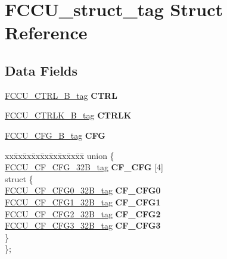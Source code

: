 \hypertarget{structFCCU__struct__tag}{}\section{F\+C\+C\+U\+\_\+struct\+\_\+tag Struct Reference}
\label{structFCCU__struct__tag}
\subsection*{Data Fields}
\begin{DoxyCompactItemize}
\item 
\mbox{\label{structFCCU__struct__tag_a3c6d1a5649e7484df61c81ba682be9c1}} 
\mbox{\hyperlink{unionFCCU__CTRL__32B__tag}{F\+C\+C\+U\+\_\+\+C\+T\+R\+L\+\_\+B\+\_\+tag}} {\bfseries C\+T\+RL}
\item 
\mbox{\label{structFCCU__struct__tag_a0c8863135f5e4a3c5152f749d6bff5bd}} 
\mbox{\hyperlink{unionFCCU__CTRLK__32B__tag}{F\+C\+C\+U\+\_\+\+C\+T\+R\+L\+K\+\_\+B\+\_\+tag}} {\bfseries C\+T\+R\+LK}
\item 
\mbox{\label{structFCCU__struct__tag_ab76a5293657319c3ccbfa710d0ed9829}} 
\mbox{\hyperlink{unionFCCU__CFG__32B__tag}{F\+C\+C\+U\+\_\+\+C\+F\+G\+\_\+B\+\_\+tag}} {\bfseries C\+FG}
\item 
\mbox{\label{structFCCU__struct__tag_a864722bf7be457b9b94d35437d4def32}} 
\begin{tabbing}
xx\=xx\=xx\=xx\=xx\=xx\=xx\=xx\=xx\=\kill
union \{\\
\>\mbox{\hyperlink{unionFCCU__CF__CFG__32B__tag}{FCCU\_CF\_CFG\_32B\_tag}} {\bfseries CF\_CFG} \mbox{[}4\mbox{]}\\
\mbox{\label{unionFCCU__struct__tag_1_1_0D2086_acda38be3ad6a5fd0dce13796142eb2ae}} 
\>struct \{\\
\>\>\mbox{\hyperlink{unionFCCU__CF__CFG0__32B__tag}{FCCU\_CF\_CFG0\_32B\_tag}} {\bfseries CF\_CFG0}\\
\>\>\mbox{\hyperlink{unionFCCU__CF__CFG1__32B__tag}{FCCU\_CF\_CFG1\_32B\_tag}} {\bfseries CF\_CFG1}\\
\>\>\mbox{\hyperlink{unionFCCU__CF__CFG2__32B__tag}{FCCU\_CF\_CFG2\_32B\_tag}} {\bfseries CF\_CFG2}\\
\>\>\mbox{\hyperlink{unionFCCU__CF__CFG3__32B__tag}{FCCU\_CF\_CFG3\_32B\_tag}} {\bfseries CF\_CFG3}\\
\>\} \\
\}; \\


\end{tabbing}
\end{DoxyCompactItemize}

